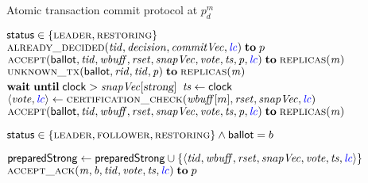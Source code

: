 
\begin{algorithm*}[t]
  \caption{Atomic transaction commit protocol at $p^{m}_{d}$}
  \label{alg:unistore-atomic-commit}
  \begin{algorithmic}[1]
    \WhenRcv[$\preparestrong(\reqIdVar, \senderMode, \tidvar, \wbuffvar, \rsetvar, \snapvc, \lccolor{\lcvar}) \from \pvar$]
      \label{line:function-preparestrong}
      \State \pre ${\sf status} \in \{\textsc{leader}, \textsc{restoring}\}$
        \label{line:preparestrong-precondition}
      \hStatex
      \If{$\exists \langle \tidvar, \_, \decisionvar, \commitvc, \lccolor{\lcvar} \rangle \in \decidedstrong$}
        \label{line:preparestrong-case-alreadydecided}
        \State \send $\Call{\alreadydecided}{\tidvar, \decisionvar, \commitvc, \lccolor{\lcvar}} \sendto p$
          \label{line:preparestrong-call-alreadydecided}
      \ElsIf{$\exists \langle \tidvar, \_, \_, \snapvc, \votevar, \tsvar, \lccolor{\lcvar} \rangle \in \preparedstrong$}
        \State \send $\Call{\accept}{\ballotVar, \tidvar, \wbuffvar, \rsetvar, \snapvc, \votevar, \tsvar, \pvar, \lccolor{\lcvar}}
          \sendto \replicas(\mvar)$
      \ElsIf{$\senderMode = \restoring$}
        \State \send $\Call{\unknownTx}{\ballotVar, \reqIdVar, \tidvar, \pvar} \sendto \replicas(\mvar)$
      \ElsIf{$\statusVar = \leaderproc$}
        \State ${\bf wait}\;{\bf until}\; {\sf clock} > \mathit{snapVec}[\textsl{strong}]$
          \label{line:preparestrong-clock}
        \State $\mathit{ts} \gets {\sf clock}$
          \label{line:preaprestrong-ts}
        \State $\langle \votevar, \lccolor{\lcvar} \rangle \gets
          \Call{\certification}{\wbuffvar[m], \rsetvar, \snapvc, \lccolor{\lcvar}}$
          \label{line:preparestrong-call-certification}
        \State \send $\Call{\accept}{\ballotVar, \tidvar, \wbuffvar, \rsetvar, \snapvc,
          \votevar, \tsvar, \pvar, \lccolor{\lcvar}} \sendto \replicas(\mvar)$
          \label{line:preparestrong-call-accept}
      \EndIf
    \EndWhenRcv

    \Statex
    \WhenRcv[$\accept(\ballotvar, \tidvar, \wbuffvar, \rsetvar,
      \snapvc, \votevar, \tsvar, \pvar, \lccolor{\lcvar})$]
      \label{line:function-accept}
      \State \pre ${\sf status} \in \{\textsc{leader}, \textsc{follower}, \textsc{restoring}\} \land {\sf ballot} = b$
        \label{line:accept-precondition}

      \hStatex
      \State ${\sf preparedStrong} \gets {\sf preparedStrong} \cup
        \{\langle \mathit{tid}, \mathit{wbuff}, \mathit{rset}, \mathit{snapVec}, \mathit{vote}, \mathit{ts}, \textcolor{blue}{\mathit{lc}} \rangle\}$
        \label{line:accept-preparedstrong}
      \State \send $\Call{\acceptack}{\mvar, \ballotvar, \tidvar, \votevar, \tsvar, \lccolor{\lcvar}}
        \sendto p$
        \label{line:accept-call-acceptack}
    \EndWhenRcv


\end{algorithmic}
\end{algorithm*}
